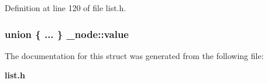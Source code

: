 Definition at line 120 of file list.h.
\subsubsection{\setlength{\rightskip}{0pt plus 5cm}union \{ ... \} 
   \bf{\_\-node::value}}\label{struct__node_4541065aa90bd0db62b0a860b32ab3c3}




The documentation for this struct was generated from the following file:\begin{CompactItemize}
\item 
\bf{list.h}\end{CompactItemize}

